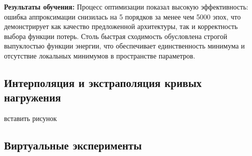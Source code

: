\textbf{Результаты обучения:}
Процесс оптимизации показал высокую эффективность: ошибка аппроксимации снизилась на 5 порядков за менее чем 5000 эпох, 
что демонстрирует как качество предложенной архитектуры, так и корректность выбора функции потерь. 
Столь быстрая сходимость обусловлена строгой выпуклостью функции энергии, что обеспечивает единственность 
минимума и отсутствие локальных минимумов в пространстве параметров.

\subsection{Интерполяция и экстраполяция кривых нагружения}
  вставить рисунок

\subsection{Виртуальные эксперименты}








